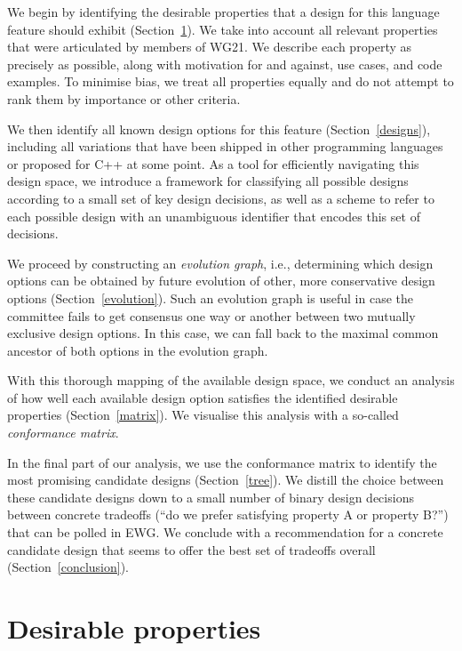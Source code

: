 We begin by identifying the desirable properties that a design for this language feature should exhibit (Section~\ref{properties}). We take into account all relevant properties that were articulated by members of WG21. We describe each property as precisely as possible, along with motivation for and against, use cases, and code examples. To minimise bias, we treat all properties equally and do not attempt to rank them by importance or other criteria.

We then identify all known design options for this feature (Section~\ref{designs}), including all variations that have been shipped in other programming languages or proposed for C++ at some point. As a tool for efficiently navigating this design space, we introduce a framework for classifying all possible designs according to a small set of key design decisions, as well as a scheme to refer to each possible design with an unambiguous identifier that encodes this set of decisions.

We proceed by constructing an \emph{evolution graph}, i.e., determining which design options can be obtained by future evolution of other, more conservative design options (Section~\ref{evolution}). Such an evolution graph is useful in case the committee fails to get consensus one way or another between two mutually exclusive design options. In this case, we can fall back to the maximal common ancestor of both options in the evolution graph.

With this thorough mapping of the available design space, we conduct an analysis of how well each available design option satisfies the identified desirable properties (Section~\ref{matrix}). We visualise this analysis with a so-called \emph{conformance matrix}. 

In the final part of our analysis, we use the conformance matrix to identify the most promising candidate designs (Section~\ref{tree}). We distill the choice between these candidate designs down to a small number of binary design decisions between concrete tradeoffs (``do we prefer satisfying property A or property B?'') that can be polled in EWG. We conclude with a recommendation for a concrete candidate design that seems to offer the best set of tradeoffs overall (Section~\ref{conclusion}).


\section{Desirable properties}
\label{properties}

